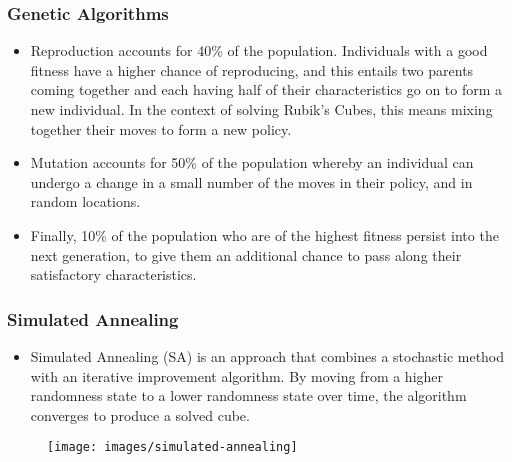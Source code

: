 \documentclass[UKenglish]{beamer}
\begin{document}
\begin{frame}
\frametitle{Genetic Algorithms}
\begin{itemize}
    \item Reproduction accounts for 40\% of the population. Individuals with a good fitness have a higher chance of reproducing, and this entails two parents coming together and each having half of their characteristics go on to form a new individual. In the context of solving Rubik's Cubes, this means mixing together their moves to form a new policy.
    \item Mutation accounts for 50\% of the population whereby an individual can undergo a change in a small number of the moves in their policy, and in random locations.
    \item Finally, 10\% of the population who are of the highest fitness persist into the next generation, to give them an additional chance to pass along their satisfactory characteristics.
\end{itemize}

\end{frame}

\begin{frame}
\frametitle{Simulated Annealing}
\begin{itemize}
    \item Simulated Annealing (SA) is an approach that combines a stochastic method with an iterative improvement algorithm. By moving from a higher randomness state to a lower randomness state over time, the algorithm converges to produce a solved cube.
\end{itemize}

\begin{figure}[!h]
\begin{small}
\centering
\linespread{1.0}
\texttt{[image: images/simulated-annealing]}
\label{fig:fig12}
\end{small}
\end{figure}

\end{frame}
\end{document}
